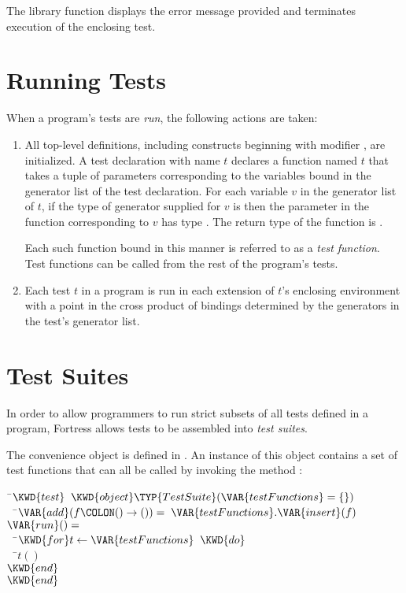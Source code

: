 The library function  displays the error message provided
and terminates execution of the enclosing test.

\section{Running Tests}

When a program's tests are \emph{run}, the following actions are
taken:
\begin{enumerate}
\item All top-level
definitions, including constructs beginning with modifier , are
initialized. A test declaration with name $t$ declares a function named $t$
that takes a tuple of parameters corresponding to the variables bound in
the generator list of the test declaration.
For each variable $v$ in the generator list
of $t$, if the type of generator supplied for $v$ is
then the parameter in the function corresponding to $v$ has type
\EXP{\mathrm{\alpha}}. The return type of the function is \EXP{()}.

Each such function bound in this manner is referred to as a
\emph{test function}.
Test functions can be called from the rest of the program's tests.

\item Each test $t$ in a program is run in each extension of
$t$'s enclosing environment with a point in the cross product
of bindings determined by the generators in the test's generator list.
\end{enumerate}


\section{Test Suites}

In order to allow programmers to run strict subsets of all tests
defined in a program, Fortress allows tests to be
assembled into \emph{test suites}.

The convenience object  is defined in \library.
An instance of this object contains a set of test functions that can all
be called by invoking the method :

%
%
\begin{Fortress}
{\tt~}\pushtabs\=\+\( \KWD{test}\;\;\KWD{object} \TYP{TestSuite}(\VAR{testFunctions} = \{\})\)\\[4pt]
{\tt~~}\pushtabs\=\+\(   \VAR{add}(f\COLON () \rightarrow ()) = \;\VAR{testFunctions}.\VAR{insert}(f)\)\\[4pt]
\(   \VAR{run}() =\)\\
{\tt~~}\pushtabs\=\+\(     \KWD{for} t \leftarrow \VAR{testFunctions}\;\;\KWD{do}\)\\
{\tt~~}\pushtabs\=\+\(       t()\)\-\\\poptabs
\(     \KWD{end}\)\-\-\\\poptabs\poptabs
\( \KWD{end}\)\-\\\poptabs
\end{Fortress}

